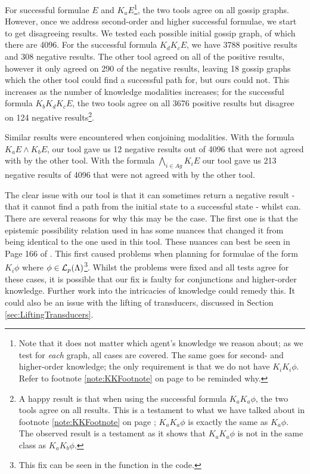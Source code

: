 \documentclass[10pt, a4paper]{report}
\begin{document}
For successful formulae $E$ and $K_a E$\footnote{Note that it does not matter
  which agent's knowledge we reason about; as we test for \emph{each} graph, all
  cases are covered. The same goes for second- and higher-order knowledge; the
  only requirement is that we do not have $K_i K_i \phi$. Refer to footnote
  \ref{note:KKFootnote} on page \pageref{note:KKFootnote} to be reminded why.},
the two tools agree on all gossip graphs. However, once we address second-order
and higher successful formulae, we start to get disagreeing results. We tested
each possible initial gossip graph, of which there are 4096. For the successful
formula $K_d K_c E$, we have 3788 positive results and 308 negative results. The
other tool agreed on all of the positive results, however it only agreed on 290 of
the negative results, leaving 18 gossip graphs which the other tool could find a
successful path for, but ours could not. This increases as the number of
knowledge modalities increases; for the successful formula $K_b K_d K_c E$, the
two tools agree on all 3676 positive results but disagree on 124 negative
results\footnote{A happy result is that when using the successful formula $K_a
  K_a \phi$, the two tools agree on all results. This is a testament to what we
  have talked about in footnote \ref{note:KKFootnote} on page
  \pageref{note:KKFootnote}; $K_a K_a \phi$ is exactly the same as $K_a \phi$.
  The observed result is a testament as it shows that $K_a K_a \phi$ is not in
  the same class as $K_a K_b \phi$.}.

Similar results were encountered when conjoining modalities. With the formula
$K_a E \land K_b E$, our tool gave us 12 negative results out of 4096 that were
not agreed with by the other tool. With the formula $\bigwedge_{i \in Ag} K_i E$
our tool gave us 213 negative results of 4096 that were not agreed with by the
other tool.

The clear issue with our tool is that it can sometimes return a negative result
- that it cannot find a path from the initial state to a successful state -
whilst \cite{GithubGossip} can. There are several reasons for why this may be
the case. The first one is that the epistemic possibility relation used in
\cite{GithubGossip} has some nuances that changed it from being identical to the
one used in this tool. These nuances can best be seen in Page 166 of
\cite{SMCDEL}. This first caused problems when planning for formulae of the form
$K_i \phi$ where $\phi \in \mathcal{L}_p(\Lambda)$\footnote{This fix can be seen in
  the  function in the code.}. Whilst the problems were fixed
and all tests agree for these cases, it is possible that our fix is faulty for
conjunctions and higher-order knowledge. Further work into the intricacies of
knowledge could remedy this. It could also be an issue with the lifting of
transducers, discussed in Section \ref{sec:LiftingTransducers}.
\end{document}
